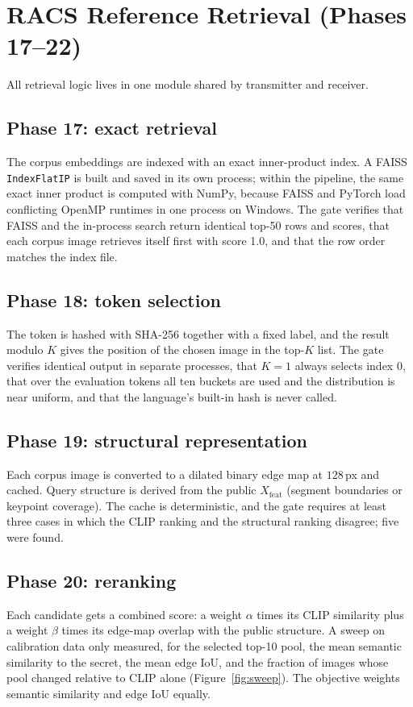 \section{RACS Reference Retrieval (Phases 17--22)}
All retrieval logic lives in one module shared by transmitter and receiver.

\subsection{Phase 17: exact retrieval}
The corpus embeddings are indexed with an exact inner-product index. A FAISS
\texttt{IndexFlatIP} is built and saved in its own process; within the pipeline, the same exact
inner product is computed with NumPy, because FAISS and PyTorch load conflicting OpenMP runtimes
in one process on Windows. The gate verifies that FAISS and the in-process search return identical
top-50 rows and scores, that each corpus image retrieves itself first with score 1.0, and that the
row order matches the index file.

\subsection{Phase 18: token selection}
The token is hashed with SHA-256 together with a fixed label, and the result modulo $K$
gives the position of the chosen image in the top-$K$ list. The gate verifies identical output in separate processes, that $K=1$ always selects index 0, that
over the evaluation tokens all ten buckets are used and the distribution is near uniform, and
that the language's built-in hash is never called.

\subsection{Phase 19: structural representation}
Each corpus image is converted to a dilated binary edge map at $128$\,px and cached. Query
structure is derived from the public $X_{\mathrm{feat}}$ (segment boundaries or keypoint
coverage). The cache is deterministic, and the gate requires at least three cases in which the
CLIP ranking and the structural ranking disagree; five were found.

\subsection{Phase 20: reranking}
Each candidate gets a combined score: a weight $\alpha$ times its CLIP similarity plus a weight
$\beta$ times its edge-map overlap with the public structure. A sweep on
calibration data only measured, for the selected top-10 pool, the mean semantic similarity to the
secret, the mean edge IoU, and the fraction of images whose pool changed relative to CLIP alone
(Figure~\ref{fig:sweep}). The objective weights semantic similarity and edge IoU equally.

